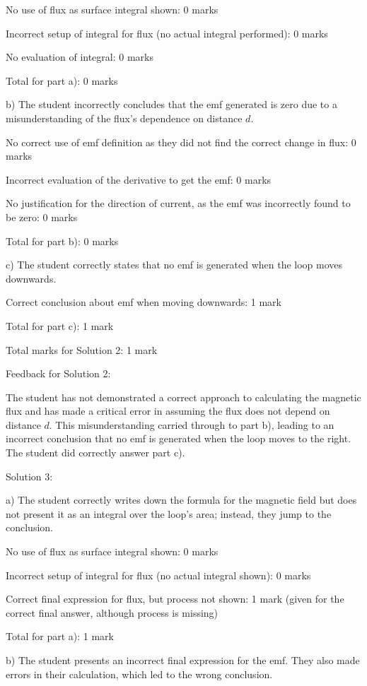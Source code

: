 \documentclass[a4paper,11pt]{article}
\begin{document}
No use of flux as surface integral shown: 0 marks

Incorrect setup of integral for flux (no actual integral performed): 0 marks

No evaluation of integral: 0 marks

Total for part a): 0 marks

b) The student incorrectly concludes that the emf generated is zero due to a misunderstanding of the flux's dependence on distance \(d\).

No correct use of emf definition as they did not find the correct change in flux: 0 marks

Incorrect evaluation of the derivative to get the emf: 0 marks

No justification for the direction of current, as the emf was incorrectly found to be zero: 0 marks

Total for part b): 0 marks

c) The student correctly states that no emf is generated when the loop moves downwards.

Correct conclusion about emf when moving downwards: 1 mark

Total for part c): 1 mark

Total marks for Solution 2: 1 mark

Feedback for Solution 2:

The student has not demonstrated a correct approach to calculating the magnetic flux and has made a critical error in assuming the flux does not depend on distance \(d\). This misunderstanding carried through to part b), leading to an incorrect conclusion that no emf is generated when the loop moves to the right. The student did correctly answer part c).

Solution 3:

a) The student correctly writes down the formula for the magnetic field but does not present it as an integral over the loop's area; instead, they jump to the conclusion.

No use of flux as surface integral shown: 0 marks

Incorrect setup of integral for flux (no actual integral shown): 0 marks

Correct final expression for flux, but process not shown: 1 mark (given for the correct final answer, although process is missing)

Total for part a): 1 mark

b) The student presents an incorrect final expression for the emf. They also made errors in their calculation, which led to the wrong conclusion.
\end{document}
